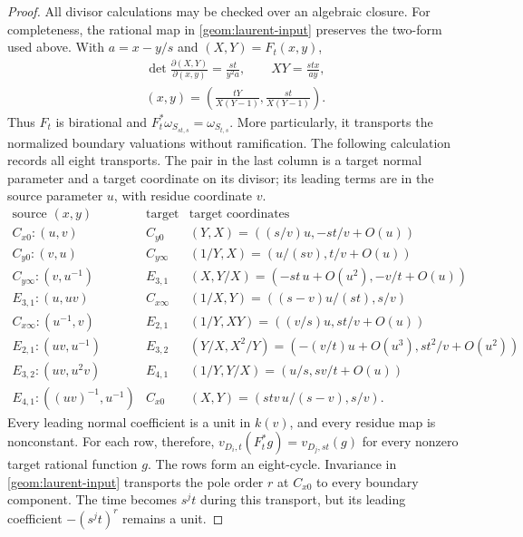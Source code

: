 \begin{proof}
All divisor calculations may be checked over an algebraic closure.
For completeness, the rational map in \eqref{geom:laurent-input}
preserves the two-form used above.  With $a=x-y/s$ and
$(X,Y)=F_t(x,y)$,
\[
\begin{gathered}
\det\frac{\partial(X,Y)}{\partial(x,y)}=\frac{st}{y^2a},
\qquad XY=\frac{stx}{ay},\\
(x,y)=\left(\frac{tY}{X(Y-1)},\frac{st}{X(Y-1)}\right).
\end{gathered}
\]
Thus $F_t$ is birational and $F_t^*\omega_{S_{st,s}}=\omega_{S_{t,s}}$.
More particularly, it transports the normalized boundary valuations
without ramification.  The following calculation records all eight
transports.  The pair in the last column is a target normal parameter
and a target coordinate on its divisor; its leading terms are in the
source parameter $u$, with residue coordinate $v$.
\[
\begin{array}{c|c|l}
\text{source }(x,y)&\text{target}&\text{target coordinates}\\ \hline
C_{x0}:(u,v)&C_{y0}&(Y,X)=((s/v)u,-st/v+O(u))\\
C_{y0}:(v,u)&C_{y\infty}&(1/Y,X)=(u/(sv),t/v+O(u))\\
C_{y\infty}:(v,u^{-1})&E_{3,1}
 &(X,Y/X)=(-st\,u+O(u^2),-v/t+O(u))\\
E_{3,1}:(u,uv)&C_{x\infty}
 &(1/X,Y)=((s-v)u/(st),s/v)\\
C_{x\infty}:(u^{-1},v)&E_{2,1}
 &(1/Y,XY)=((v/s)u,st/v+O(u))\\
E_{2,1}:(uv,u^{-1})&E_{3,2}
 &(Y/X,X^2/Y)=(-(v/t)u+O(u^3),st^2/v+O(u^2))\\
E_{3,2}:(uv,u^2v)&E_{4,1}
 &(1/Y,Y/X)=(u/s,sv/t+O(u))\\
E_{4,1}:((uv)^{-1},u^{-1})&C_{x0}
 &(X,Y)=(stv\,u/(s-v),s/v).
\end{array}
\]
Every leading normal coefficient is a unit in $k(v)$, and every
residue map is nonconstant.  For each row, therefore,
$v_{D_i,t}(F_t^*g)=v_{D_j,st}(g)$ for every nonzero target rational
function $g$.  The rows form an eight-cycle.  Invariance in
\eqref{geom:laurent-input} transports the pole order $r$ at $C_{x0}$
to every boundary component.  The time becomes $s^jt$ during this
transport, but its leading coefficient $-(s^jt)^r$ remains a unit.


\end{proof}
